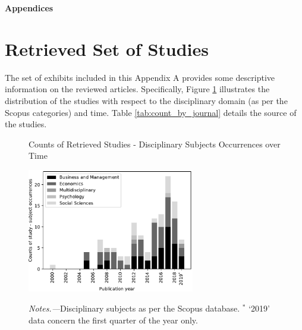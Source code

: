 \documentclass[english]{article}
\begin{document}
\clearpage





\clearpage



\begin{appendices}


\noindent \LARGE \textbf{Appendices}

\normalsize

\section{Retrieved Set of Studies }\label{appendix_a}

\noindent The set of exhibits included in this Appendix A provides some descriptive
information on the reviewed articles. Specifically,
Figure \ref{fig:disciplinary_subjs} illustrates the distribution of the studies
with respect to the disciplinary domain (as per the Scopus categories) and
time. Table \ref{tab:count_by_journal} details the source of the studies. 

\begin{figure}[!htbp]
	\centering
	\caption{Counts of Retrieved Studies - Disciplinary
	         Subjects Occurrences over Time}
		 \includegraphics[width=0.65\textwidth]{A_0}
	\label{fig:disciplinary_subjs}
	\caption*{\textit{Notes.---}Disciplinary subjects as per the Scopus
	database. $^{*}$ `2019' data concern the first quarter of the year only.}
\end{figure}



\end{appendices}
\end{document}
